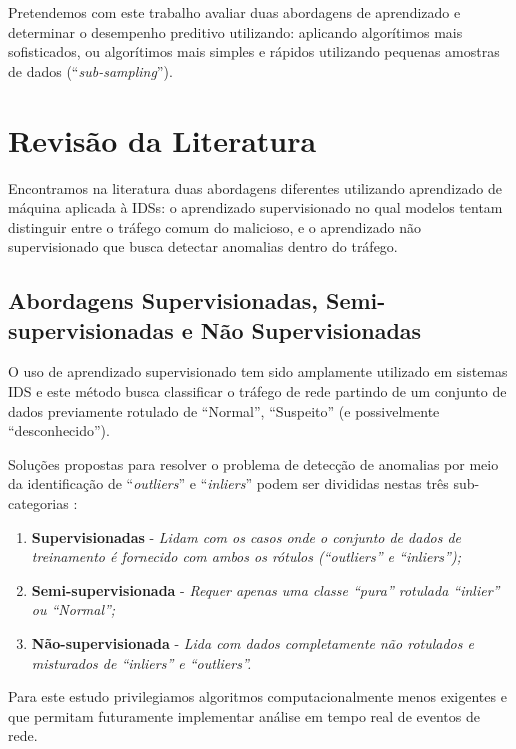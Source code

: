 \documentclass[twoside]{article}
\begin{document}
Pretendemos com este trabalho avaliar duas abordagens de aprendizado e determinar o desempenho preditivo utilizando: aplicando algorítimos mais sofisticados, ou algorítimos mais simples e rápidos utilizando pequenas amostras de dados (``\textit{sub-sampling}'').

\section{Revisão da Literatura}

Encontramos na literatura duas abordagens diferentes utilizando aprendizado de máquina aplicada à \glspl{IDS}: o aprendizado supervisionado no qual modelos tentam distinguir entre o tráfego comum do malicioso, e o aprendizado não supervisionado que busca detectar anomalias dentro do tráfego.

\subsection{Abordagens Supervisionadas, Semi-supervisionadas e Não Supervisionadas}

O uso de aprendizado supervisionado tem sido amplamente utilizado em sistemas \gls{IDS} \cite{he2017machine} e este método busca classificar o tráfego de rede partindo de um conjunto de dados previamente rotulado de ``Normal'', ``Suspeito'' (e possivelmente ``desconhecido'').

Soluções propostas para resolver o problema de detecção de anomalias por meio da identificação de ``\textit{outliers}'' e ``\textit{inliers}'' podem ser divididas nestas três sub-categorias \cite{aggarwal2016outlier}:

\begin{enumerate}
    \item \textbf{Supervisionadas} - \textit{Lidam com os casos onde o conjunto de dados de treinamento é fornecido com ambos os rótulos (``outliers'' e ``inliers'');}
    \item \textbf{Semi-supervisionada} - \textit{Requer apenas uma classe ``pura'' rotulada ``inlier'' ou ``Normal'';}
    \item \textbf{Não-supervisionada} - \textit{Lida com dados completamente não rotulados e misturados de ``inliers'' e ``outliers''.}
\end{enumerate}

Para este estudo privilegiamos algoritmos computacionalmente menos exigentes e que permitam futuramente implementar análise em tempo real de eventos de rede.
\end{document}
